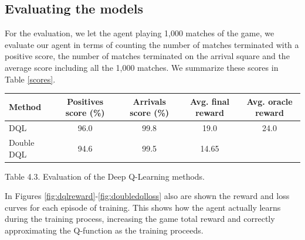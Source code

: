 \documentclass{article}
\begin{document}
\subsection{Evaluating the models}

For the evaluation, we let the agent playing 1,000 matches of the game, we evaluate our agent in terms of counting the number of matches terminated with a positive score, the number of matches terminated on the arrival square and the average score including all the 1,000 matches. We summarize these scores in Table \ref{scores}.

\begin{center}
	\label{scores}
	\begin{tabular}{ |l|c|c|c|c| } 
		\hline
		Method & Positives score (\%) & Arrivals score (\%) & Avg. final reward & Avg. oracle reward \\ 
		\hline
		DQL & 96.0 & 99.8 & 19.0 & 24.0 \\ 
		Double DQL  & 94.6 & 99.5 & 14.65 & \\ 
		\hline
	\end{tabular}
	Table 4.3. Evaluation of the Deep Q-Learning methods.
\end{center}

In Figures \ref{fig:dqlreward}-\ref{fig:doubledqlloss} also are shown the reward and loss curves for each episode of training. This shows how the agent actually learns during the training process, increasing the game total reward and correctly approximating the Q-function as the training proceeds.
\end{document}

